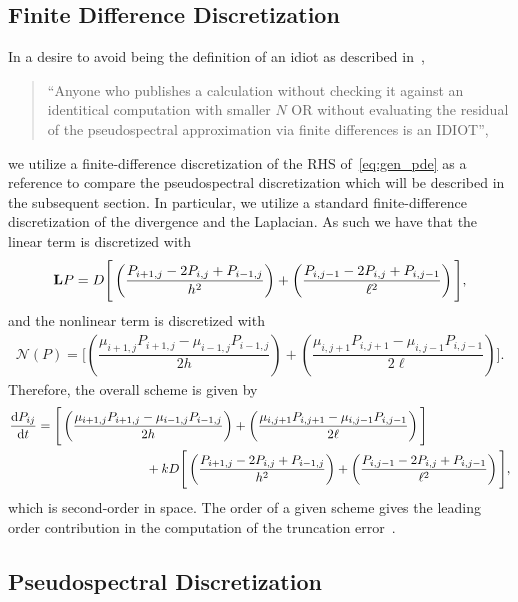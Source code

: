 \documentclass[11pt]{article}
\newcommand{\mN}{\bm{\mathcal{N}}}
\begin{document}
\subsection{Finite Difference Discretization}

In a desire to avoid being the definition of an idiot as described in~\cite{boyd2013chebyshev},
\begin{quote}
    ``Anyone who publishes a calculation without checking it against an identitical computation with smaller $N$ OR without evaluating the residual of the pseudospectral approximation via finite differences is an IDIOT'',
\end{quote}
we utilize a finite-difference discretization of the RHS of~\eqref{eq:gen_pde} as a reference to compare the pseudospectral discretization which will be described in the subsequent section. In particular, we utilize a standard finite-difference discretization of the divergence and the Laplacian. As such we have that the linear term is discretized with
\begin{align}
    \vb{L}P = D\Bigg[\left(\dfrac{P_{i+1,j}-2P_{i,j}+P_{i-1,j}}{h^{2}}\right) + \left(\dfrac{P_{i,j-1}-2P_{i,j}+P_{i,j-1}}{\ell^{2}}\right) \Bigg],
\end{align}
and the nonlinear term is discretized with
\begin{align}
    \mN(P)=\Bigg[
        \left(\dfrac{\mu_{i+1,j}P_{i+1,j}-\mu_{i-1,j}P_{i-1,j}}{2h}\right) + \left(\dfrac{\mu_{i,j+1}P_{i,j+1}-\mu_{i,j-1}P_{i,j-1}}{2\ell}\right)
        \Bigg].
\end{align}
Therefore, the overall scheme is given by
\begin{align}
    \dv{P_{ij}}{t} &= \Bigg[
    \left(\dfrac{\mu_{i+1,j}P_{i+1,j}-\mu_{i-1,j}P_{i-1,j}}{2h}\right) + \left(\dfrac{\mu_{i,j+1}P_{i,j+1}-\mu_{i,j-1}P_{i,j-1}}{2\ell}\right)
    \Bigg] \nonumber\\
    &\hspace{3cm}+ kD\Bigg[\left(\dfrac{P_{i+1,j}-2P_{i,j}+P_{i-1,j}}{h^{2}}\right) + \left(\dfrac{P_{i,j-1}-2P_{i,j}+P_{i,j-1}}{\ell^{2}}\right) \Bigg],\label{eq:central_space}
\end{align} 
which is second-order in space. The order of a given scheme gives the leading order contribution in the computation of the truncation error~\cite{leveque2007finite}. 

\subsection{Pseudospectral Discretization}
\end{document}
